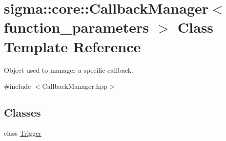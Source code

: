 \hypertarget{classsigma_1_1core_1_1_callback_manager}{}\section{sigma\+:\+:core\+:\+:Callback\+Manager$<$ function\+\_\+parameters $>$ Class Template Reference}
\label{classsigma_1_1core_1_1_callback_manager}


Object used to manager a specific callback.  




{\ttfamily \#include $<$Callback\+Manager.\+hpp$>$}

\subsection*{Classes}
\begin{DoxyCompactItemize}
\item 
class \hyperlink{classsigma_1_1core_1_1_callback_manager_1_1_trigger}{Trigger}
\end{DoxyCompactItemize}

